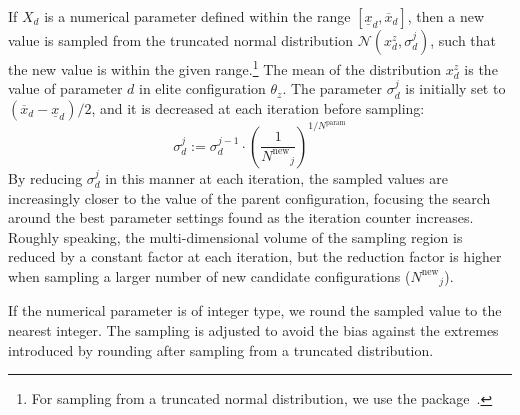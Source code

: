 \documentclass[article,a4paper,nojss,notitle]{jss}
\newcommand{\assign}{\ensuremath{:=}}
\newcommand{\iter}{\ensuremath{j}\xspace}
\newcommand{\Nparam}{\ensuremath{{N^\text{param}}}\xspace}
\newcommand{\Nnew}{\ensuremath{N^\text{new}}\xspace}
\begin{document}
If $X_d$ is a numerical parameter defined within the range $[\underline{x}_d, \overline{x}_d]$, then a new value is sampled from
the truncated normal distribution $\mathcal{N}(x_d^z,\sigma_d^{\iter})$, such that the new value is within
the given range.\footnote{%
  For sampling from a truncated normal distribution, we use the
   package~\citep{Jac2011jss}.} The mean of the
distribution $x_d^z$ is the value of parameter $d$ in elite
configuration $\theta_z$. The parameter $\sigma_d^{\iter}$ 
is initially set to $(\overline{x}_d
- \underline{x}_d)/ 2$, and it
is decreased at each iteration before sampling:
%
\begin{equation}\label{eq:sigma}
  \sigma_d^{\iter} \assign  \sigma_d^{\iter-1} \cdot \left(\frac{1}{\Nnew_{\iter}}\right)^{1/\Nparam}
\end{equation}
%
By reducing $\sigma_d^{\iter}$ in this manner at each iteration, the sampled
values are increasingly closer to the value of the parent configuration,
 focusing the search around the best parameter settings
found as the iteration counter increases. Roughly speaking, the multi-dimensional volume of the sampling
region is reduced by a constant factor at each iteration, but the
reduction factor is higher when sampling a larger number of new
candidate configurations ($\Nnew_{\iter}$).

If the numerical parameter is of integer type, we round the sampled
value to the nearest integer. The sampling is adjusted to avoid the
bias against the extremes introduced by rounding after sampling from a
truncated  distribution.

\end{document}
